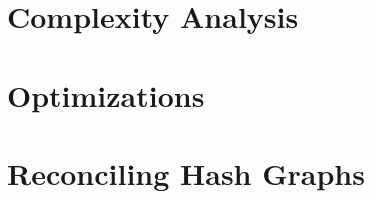 \section{Complexity Analysis}
\label{set-reconciliation-simple-complexity}




\section{Optimizations}
\label{set-reconciliation-simple-optimizations}





\section{Reconciling Hash Graphs}
\label{set-reconciliation-simple-graphs}
